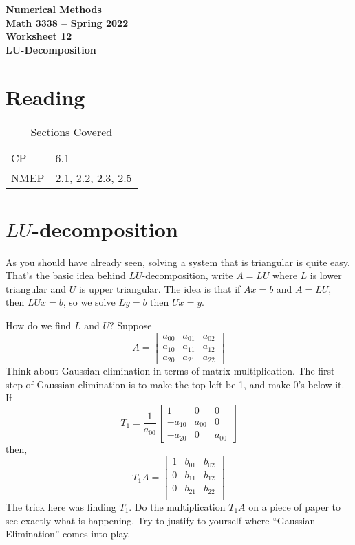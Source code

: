 \documentclass[11pt,letterpaper]{article}
\newcommand{\semester}{Spring 2022}
\begin{document}
\begin{center}
{\huge{\bf  Numerical Methods}} \\[1.5ex]
{\bf Math 3338 -- \semester}\\[1.5ex]
{\Large{\bf Worksheet 12\ \\[2ex] LU-Decomposition}}\\
\end{center}
\vspace{2mm}


\section{Reading}

\begin{table}[!ht]
 \centering
 \begin{tabular}{ll}
   CP &  6.1 \\
 NMEP & 2.1, 2.2, 2.3, 2.5
 \end{tabular}
\caption{Sections Covered}
\end{table}

\section{$LU$-decomposition}
As you should have already seen, solving a system that is triangular is quite easy. That's the basic
idea behind $LU$-decomposition, write $A = LU$ where $L$ is lower triangular and $U$ is upper 
triangular. The idea is that if $Ax=b$ and $A = LU$, then $LUx=b$, so we solve $Ly=b$ then $Ux = y$. 

How do we find $L$ and $U$? Suppose
\[
 A = \begin{bmatrix}
a_{00} & a_{01} & a_{02} \\
a_{10} & a_{11} & a_{12} \\
a_{20} & a_{21} & a_{22} 
\end{bmatrix}
\]
Think about Gaussian elimination in terms of matrix multiplication. The first step of Gaussian
elimination is to make the top left be 1, and make 0's below it. If
\[
 T_1 = \frac{1}{a_{00}}\begin{bmatrix}
1 & 0 & 0 \\
-a_{10} & a_{00} & 0 \\
-a_{20} & 0 & a_{00}
\end{bmatrix}
\]
then,
\[
T_1A = \begin{bmatrix}
1 & b_{01} & b_{02} \\
0 & b_{11} & b_{12} \\
0 & b_{21} & b_{22} \\
\end{bmatrix}
\]
The trick here was finding $T_1$. Do the multiplication $T_1A$ on a piece of paper to see exactly what is happening. Try to justify to yourself where ``Gaussian Elimination'' comes into play.
\end{document}
